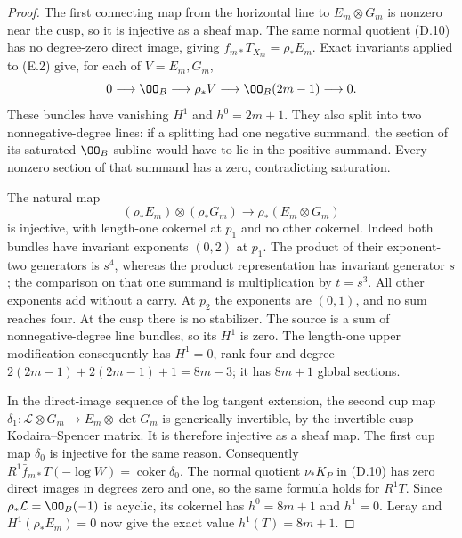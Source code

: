 \begin{proof}
The first connecting map from the horizontal line to
$E_m\otimes G_m$ is nonzero near the cusp, so it is injective as a
sheaf map. The same normal quotient (D.10) has no degree-zero direct
image, giving $f_{m*}T_{X_m}=\rho_*E_m$.
Exact invariants applied to (E.2) give, for each of $V=E_m,G_m$,
\[
 0\longrightarrow\OO_B\longrightarrow\rho_*V
 \longrightarrow\OO_B(2m-1)\longrightarrow0.
\]
These bundles have vanishing $H^1$ and $h^0=2m+1$.
They also split into two nonnegative-degree lines: if a splitting
had one negative summand, the section of its saturated $\OO_B$
subline would have to lie in the positive summand. Every nonzero
section of that summand has a zero, contradicting saturation.

The natural map
\[
 (\rho_*E_m)\otimes(\rho_*G_m)
              \longrightarrow\rho_*(E_m\otimes G_m)
\]
is injective, with length-one cokernel at $p_1$ and no other
cokernel. Indeed both bundles have invariant exponents $(0,2)$ at
$p_1$. The product of their exponent-two generators is $s^4$,
whereas the product representation has invariant generator $s$;
the comparison on that one summand is multiplication by $t=s^3$.
All other exponents add without a carry. At $p_2$ the exponents
are $(0,1)$, and no sum reaches four. At the cusp there is no
stabilizer. The source is a sum of nonnegative-degree line bundles,
so its $H^1$ is zero. The length-one upper modification consequently
has $H^1=0$, rank four and degree
$2(2m-1)+2(2m-1)+1=8m-3$; it has $8m+1$ global sections.

In the direct-image sequence of the log tangent extension, the
second cup map
$\delta_1:\mathcal L\otimes G_m\to E_m\otimes\det G_m$
is generically invertible, by the invertible cusp Kodaira--Spencer
matrix. It is therefore injective as a sheaf map. The first cup map
$\delta_0$ is injective for the same reason. Consequently
$R^1\bar f_{m*}T(-\log W)=\operatorname{coker}\delta_0$.
The normal quotient $\nu_*K_P$ in (D.10) has zero direct images in
degrees zero and one, so the same formula holds for $R^1T$.
Since $\rho_*\mathcal L=\OO_B(-1)$ is acyclic, its cokernel has
$h^0=8m+1$ and $h^1=0$. Leray and $H^1(\rho_*E_m)=0$ now give
the exact value $h^1(T)=8m+1$.


\end{proof}
